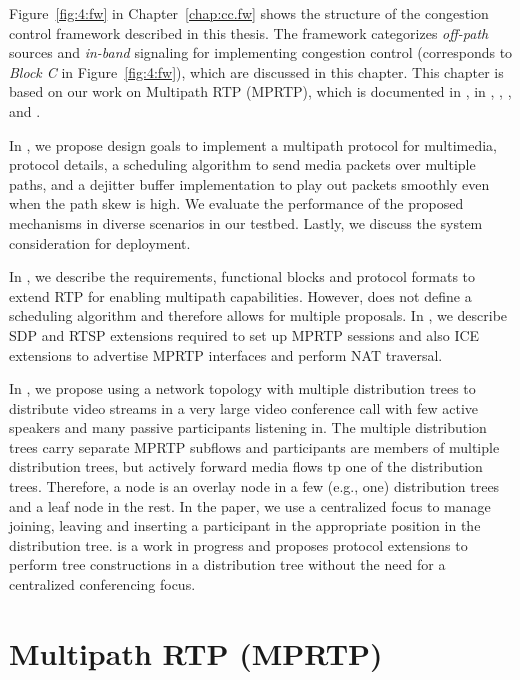 Figure~\ref{fig:4:fw} in Chapter~\ref{chap:cc.fw} shows the structure of the
congestion control framework described in this thesis. The framework
categorizes \emph{off-path} sources and \emph{in-band} signaling for
implementing congestion control (corresponds to \emph{Block C} in
Figure~\ref{fig:4:fw}), which are discussed in this chapter. This chapter is
based on our work on Multipath RTP (MPRTP), which is documented in
, in \cite{draft.mprtp}, \cite{draft.mprtp.sdp},
\cite{Globisch:AsymGrpComm}, and \cite{draft.rtcp.overlay}.

In , we propose design goals to implement a
multipath protocol for multimedia, protocol details, a scheduling algorithm to
send media packets over multiple paths, and a dejitter buffer implementation to
play out packets smoothly even when the path skew is high. We evaluate the
performance of the proposed mechanisms in diverse scenarios in our testbed.
Lastly, we discuss the system consideration for deployment.

In \cite{draft.mprtp}, we describe the requirements, functional blocks and
protocol formats to extend RTP for enabling multipath capabilities. However,
\cite{draft.mprtp} does not define a scheduling algorithm and therefore allows 
for multiple proposals. In \cite{draft.mprtp.sdp}, we describe SDP and RTSP extensions
required to set up MPRTP sessions and also ICE extensions to advertise MPRTP
interfaces and perform NAT traversal.

In \cite{Globisch:AsymGrpComm}, we propose using a network topology with
multiple distribution trees to distribute video streams in a very large
video conference call with few active speakers and many passive participants
listening in. The multiple distribution trees carry separate MPRTP subflows
and participants are members of multiple distribution trees, but actively
forward media flows tp one of the distribution trees. Therefore, a node is an
overlay node in a few (e.g., one) distribution trees and a leaf node in the
rest. In the paper, we use a centralized focus to manage joining, leaving
and inserting a participant in the appropriate position in the distribution
tree. \cite{draft.rtcp.overlay} is a work in progress and proposes protocol
extensions to perform tree constructions in a distribution tree without the
need for a centralized conferencing focus.


\section{Multipath RTP (MPRTP)}

